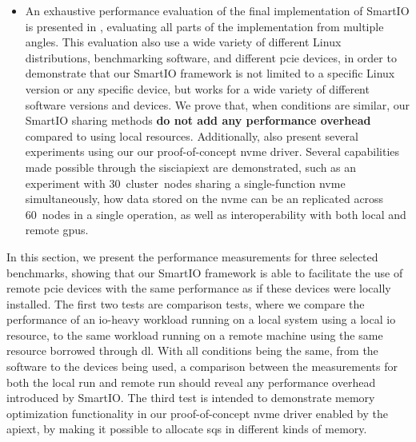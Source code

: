 \begin{itemize}
    \item An exhaustive performance evaluation of the final implementation of SmartIO is presented in , evaluating all parts of the implementation from multiple angles.
        This evaluation also use a wide variety of different Linux distributions, benchmarking software, and different \gls{pcie} devices, in order to demonstrate that our SmartIO framework is not limited to a specific Linux version or any specific device, but works for a wide variety of different software versions and devices.
        We prove that, when conditions are similar, our SmartIO sharing methods \textbf{do not add any performance overhead} compared to using local resources.
        Additionally,  also present several experiments using our our proof-of-concept \gls{nvme} driver.
        Several capabilities made possible through the \gls{sisciapiext} are demonstrated, such as an experiment with 30~cluster~nodes sharing a single-function \gls{nvme} simultaneously, how data stored on the \gls{nvme} can be  an replicated across 60~nodes in a single operation, as well as interoperability with both local and remote \glspl{gpu}.
\end{itemize}



In this section, we present the performance measurements for three selected benchmarks, showing that our SmartIO framework is able to facilitate the use of remote \gls{pcie} devices with the same performance as if these devices were locally installed.
%
The first two tests are comparison tests, where we compare the performance of an \gls{io}-heavy workload running on a local system using a local \gls{io} resource, to the same workload running on a remote machine using the same resource borrowed through \gls{dl}.
%
With all conditions being the same, from the software to the devices being used, a comparison between the measurements for both the local run and remote run should reveal any performance overhead introduced by SmartIO.
%
The third test is intended to demonstrate memory optimization functionality in our proof-of-concept \gls{nvme} driver enabled by the \gls{apiext}, by making it possible to allocate \glspl{sq} in different kinds of memory.



